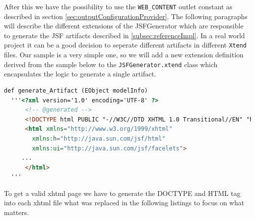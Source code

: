 After this we have the possibility to use the \texttt{WEB\_CONTENT} outlet
constant as described in section \ref{sec:outputConfigurationProvider}.\newline
The following paragraphs will describe the different extensions of the JSFGenerator
which are responsible to generate the JSF artifacts described in
\ref{subsec:referenceImpl}. In a real world project it can be a good decision to
seperate different artifacts in different \texttt{Xtend} files. Our sample is a
very simple one, so we will add a new extension definition derived from the
sample below to the \texttt{JSFGenerator.xtend} class which encapsulates the
logic to generate a single artifact.

\begin{lstlisting}[language=HTML] 
  def generate_Artifact (EObject modelInfo)
  '''<?xml version='1.0' encoding='UTF-8' ?>
      <!-- @generated -->
      <!DOCTYPE html PUBLIC "-//W3C//DTD XHTML 1.0 Transitional//EN" "http://www.w3.org/TR/xhtml1/DTD/xhtml1-transitional.dtd">
      <html xmlns="http://www.w3.org/1999/xhtml"
        xmlns:h="http://java.sun.com/jsf/html"
        xmlns:ui="http://java.sun.com/jsf/facelets">
     ...
      </html>
  '''
\end{lstlisting}

To get a valid xhtml page we have to generate the DOCTYPE
and HTML tag into each xhtml file what was replaced in the following
listings to focus on what matters.